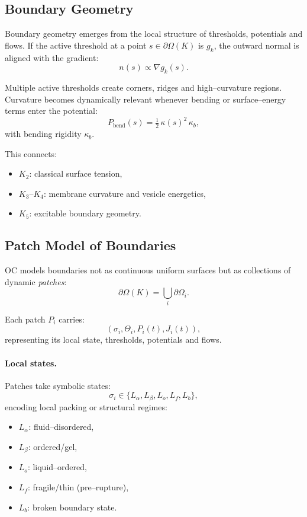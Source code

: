 \subsection{Boundary Geometry}

Boundary geometry emerges from the local structure of thresholds, potentials
and flows.  
If the active threshold at a point \(s \in \partial\Omega(K)\) is \(g_k\), the
outward normal is aligned with the gradient:
\[
  n(s) \propto \nabla g_k(s).
\]

Multiple active thresholds create corners, ridges and high–curvature regions.
Curvature becomes dynamically relevant whenever bending or surface–energy
terms enter the potential:
\[
  P_{\mathrm{bend}}(s) = \tfrac{1}{2}\,\kappa(s)^2\,\kappa_b,
\]
with bending rigidity \(\kappa_b\).

This connects:
\begin{itemize}
    \item \(K_2\): classical surface tension,
    \item \(K_3\)–\(K_4\): membrane curvature and vesicle energetics,
    \item \(K_5\): excitable boundary geometry.
\end{itemize}

\subsection{Patch Model of Boundaries}

OC models boundaries not as continuous uniform surfaces but as collections of
dynamic \emph{patches}:
\[
  \partial\Omega(K) = \bigcup_i \partial\Omega_i.
\]

Each patch \(P_i\) carries:
\[
  (\sigma_i,\Theta_i,P_i(t),J_i(t)),
\]
representing its local state, thresholds, potentials and flows.

\paragraph{Local states.}
Patches take symbolic states:
\[
  \sigma_i \in \{L_\alpha, L_\beta, L_o, L_f, L_b\},
\]
encoding local packing or structural regimes:
\begin{itemize}
    \item \(L_\alpha\): fluid–disordered,
    \item \(L_\beta\): ordered/gel,
    \item \(L_o\): liquid–ordered,
    \item \(L_f\): fragile/thin (pre–rupture),
    \item \(L_b\): broken boundary state.
\end{itemize}


